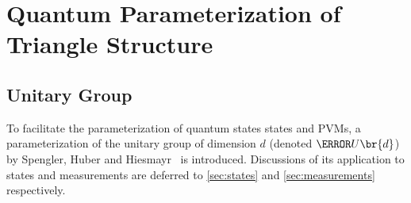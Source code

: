\documentclass[aps, 10pt, english, twoside, pra, nofootinbib, tightenlines, longbibliography, superscriptaddress]{revtex4-1}
\begin{document}
    \clearpage
    \section{Quantum Parameterization of Triangle Structure}
    \label{sec:param_quantum_dist}
    \subsection{Unitary Group}
    \label{sec:unitary_group}
    To facilitate the parameterization of quantum states states and PVMs, a parameterization of the unitary group of dimension $d$ (denoted $\s{U}\br{d}$) by Spengler, Huber and Hiesmayr~\cite{Spengler_2010_Unitary} is introduced. Discussions of its application to states and measurements are deferred to \cref{sec:states} and \cref{sec:measurements} respectively.
\end{document}
